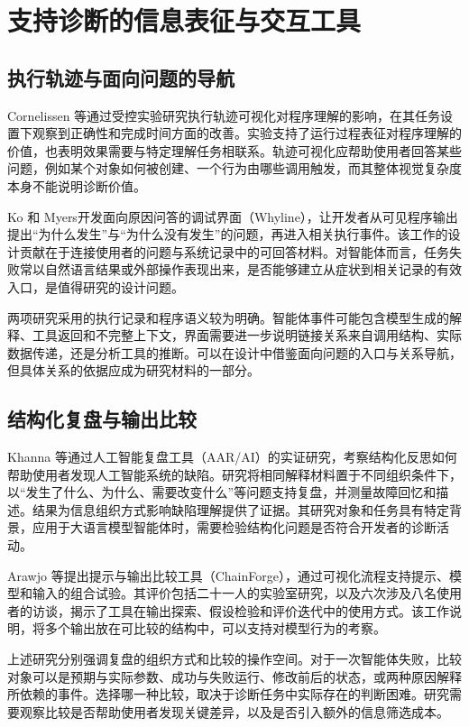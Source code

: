 \section{支持诊断的信息表征与交互工具}

\subsection{执行轨迹与面向问题的导航}

Cornelissen 等\cite{ref33}通过受控实验研究执行轨迹可视化对程序理解的影响，在其任务设置下观察到正确性和完成时间方面的改善。实验支持了运行过程表征对程序理解的价值，也表明效果需要与特定理解任务相联系。轨迹可视化应帮助使用者回答某些问题，例如某个对象如何被创建、一个行为由哪些调用触发，而其整体视觉复杂度本身不能说明诊断价值。

Ko 和 Myers\cite{ref07}开发面向原因问答的调试界面（Whyline），让开发者从可见程序输出提出“为什么发生”与“为什么没有发生”的问题，再进入相关执行事件。该工作的设计贡献在于连接使用者的问题与系统记录中的可回答材料。对智能体而言，任务失败常以自然语言结果或外部操作表现出来，是否能够建立从症状到相关记录的有效入口，是值得研究的设计问题。

两项研究采用的执行记录和程序语义较为明确。智能体事件可能包含模型生成的解释、工具返回和不完整上下文，界面需要进一步说明链接关系来自调用结构、实际数据传递，还是分析工具的推断。可以在设计中借鉴面向问题的入口与关系导航，但具体关系的依据应成为研究材料的一部分。

\subsection{结构化复盘与输出比较}

Khanna 等\cite{ref04}通过人工智能复盘工具（AAR/AI）的实证研究，考察结构化反思如何帮助使用者发现人工智能系统的缺陷。研究将相同解释材料置于不同组织条件下，以“发生了什么、为什么、需要改变什么”等问题支持复盘，并测量故障回忆和描述。结果为信息组织方式影响缺陷理解提供了证据。其研究对象和任务具有特定背景，应用于大语言模型智能体时，需要检验结构化问题是否符合开发者的诊断活动。

Arawjo 等\cite{arawjo2024chainforge}提出提示与输出比较工具（ChainForge），通过可视化流程支持提示、模型和输入的组合试验。其评价包括二十一人的实验室研究，以及六次涉及八名使用者的访谈，揭示了工具在输出探索、假设检验和评价迭代中的使用方式。该工作说明，将多个输出放在可比较的结构中，可以支持对模型行为的考察。

上述研究分别强调复盘的组织方式和比较的操作空间。对于一次智能体失败，比较对象可以是预期与实际参数、成功与失败运行、修改前后的状态，或两种原因解释所依赖的事件。选择哪一种比较，取决于诊断任务中实际存在的判断困难。研究需要观察比较是否帮助使用者发现关键差异，以及是否引入额外的信息筛选成本。

